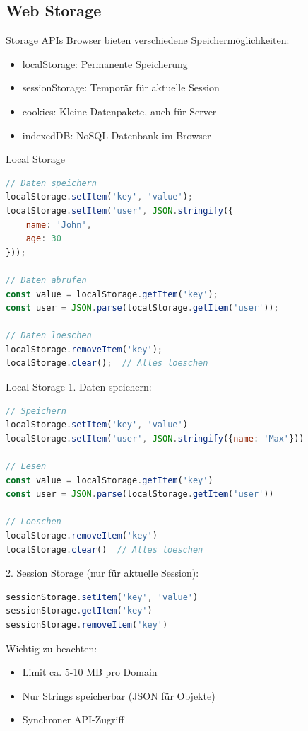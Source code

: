 \subsection{Web Storage}

\begin{concept}{Storage APIs}
    Browser bieten verschiedene Speichermöglichkeiten:
    \begin{itemize}
        \item localStorage: Permanente Speicherung
        \item sessionStorage: Temporär für aktuelle Session
        \item cookies: Kleine Datenpakete, auch für Server
        \item indexedDB: NoSQL-Datenbank im Browser
    \end{itemize}
\end{concept}

\begin{KR}{Local Storage}
\begin{lstlisting}[language=JavaScript, style=basesmol]
// Daten speichern
localStorage.setItem('key', 'value');
localStorage.setItem('user', JSON.stringify({
    name: 'John',
    age: 30
}));

// Daten abrufen
const value = localStorage.getItem('key');
const user = JSON.parse(localStorage.getItem('user'));

// Daten loeschen
localStorage.removeItem('key');
localStorage.clear();  // Alles loeschen
\end{lstlisting}
\end{KR}

\begin{KR}{Local Storage}
1. Daten speichern:
\begin{lstlisting}[language=JavaScript, style=basesmol]
// Speichern
localStorage.setItem('key', 'value')
localStorage.setItem('user', JSON.stringify({name: 'Max'}))

// Lesen
const value = localStorage.getItem('key')
const user = JSON.parse(localStorage.getItem('user'))

// Loeschen
localStorage.removeItem('key')
localStorage.clear()  // Alles loeschen
\end{lstlisting}

2. Session Storage (nur für aktuelle Session):
\begin{lstlisting}[language=JavaScript, style=basesmol]
sessionStorage.setItem('key', 'value')
sessionStorage.getItem('key')
sessionStorage.removeItem('key')
\end{lstlisting}

Wichtig zu beachten:
\begin{itemize}
  \item Limit ca. 5-10 MB pro Domain
  \item Nur Strings speicherbar (JSON für Objekte)
  \item Synchroner API-Zugriff
\end{itemize}
\end{KR}

